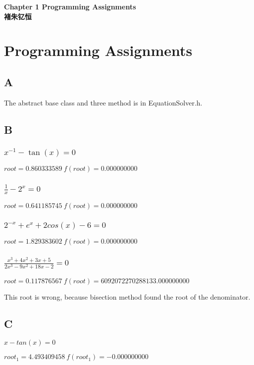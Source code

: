 \documentclass[12]{article}%
\begin{document}
\begin{center}
    \LARGE\songti\textbf{Chapter 1 Programming Assignments} \\%
    \large\kaishu\textbf{褚朱钇恒}%
\end{center}
    \section{Programming Assignments}
        \subsection{A}
            The abstract base class and three method is in EquationSolver.h.
        
        \subsection{B}
            \subsubsection{$x^{-1}-\tan(x)=0$}
                $root=0.860333589\ f(root)=0.000000000$
            \subsubsection{$\frac{1}{x}-2^x=0$}
                $root=0.641185745\ f(root)=0.000000000$
            \subsubsection{$2^{-x}+e^x+2cos(x)-6=0$}
                $root=1.829383602\ f(root)=0.000000000$
            \subsubsection{$\frac{x^3+4x^2+3x+5}{2x^3-9x^2+18x-2}=0$}
                $root=0.117876567\ f(root)=6092072270288133.000000000$
                
                This root is wrong, because bisection method found the root of the denominator.
        
        \subsection{C}
            $x-tan(x)=0$

            $root_1=4.493409458 \ f(root_1)=-0.000000000$
\end{document}
